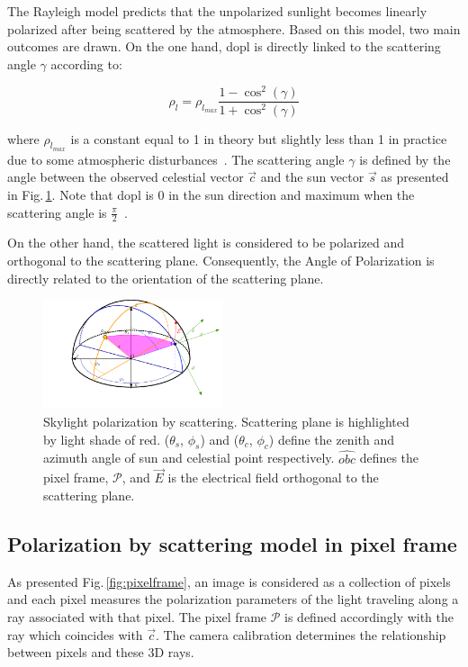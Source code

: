 The Rayleigh model predicts that the unpolarized sunlight becomes linearly
polarized after being scattered by the atmosphere. Based on this model, two
main outcomes are drawn. On the one hand, \gls{dopl} is directly linked to the
scattering angle $\gamma$ according to:

\begin{equation}
  \label{eq:3}
  \rho_{l} = \rho_{l_{max}}\frac{1 - \cos^{2}(\gamma)}{1 + \cos^{
      2}(\gamma)}
\end{equation}

\noindent where $\rho_{l_{max}}$ is a constant equal to 1 in theory but
slightly less than 1 in practice due to some atmospheric
disturbances~\cite{pomozi2001clearsky}. The scattering angle $\gamma$ is
defined by the angle between the observed celestial vector $\vec{c}$ and the
sun vector $\vec{s}$ as presented in Fig.\,\ref{fig:scattering}. Note that
\gls{dopl} is 0 in the sun direction and maximum when the scattering angle is
$\frac{\pi}{2}$~\cite{smith2007polarization,miyazaki09sunlightpolarization}.

On the other hand, the scattered light is considered to be polarized and
orthogonal to the scattering plane.  Consequently, the Angle of Polarization is
directly related to the orientation of the scattering plane.

\begin{figure}
  \centering
  \includegraphics[width=0.47\textwidth]{./content/intro/figures/polasky-iros.pdf}
  \caption{Skylight polarization by scattering. Scattering plane is highlighted
  by light shade of red. ($\theta_s$, $\phi_s$) and ($\theta_c$, $\phi_c$)
  define the zenith and azimuth angle of sun and celestial point
  respectively. $\widehat{obc}$ defines the pixel frame, $\mathcal{P}$, and
  $\vec{E}$ is the electrical field orthogonal to the scattering plane.}
    \label{fig:scattering}
\end{figure}


\subsection{Polarization by scattering model in pixel frame}
\label{subsec:pscattering}
As presented Fig.\,\ref{fig:pixelframe}, an image is considered as a collection
of pixels and each pixel measures the polarization parameters of the light
traveling along a ray associated with that pixel. The pixel frame
$\mathcal{P}$ is defined accordingly with the ray which coincides with
$\vec{c}$. The camera calibration determines the relationship between pixels
and these 3D rays.

